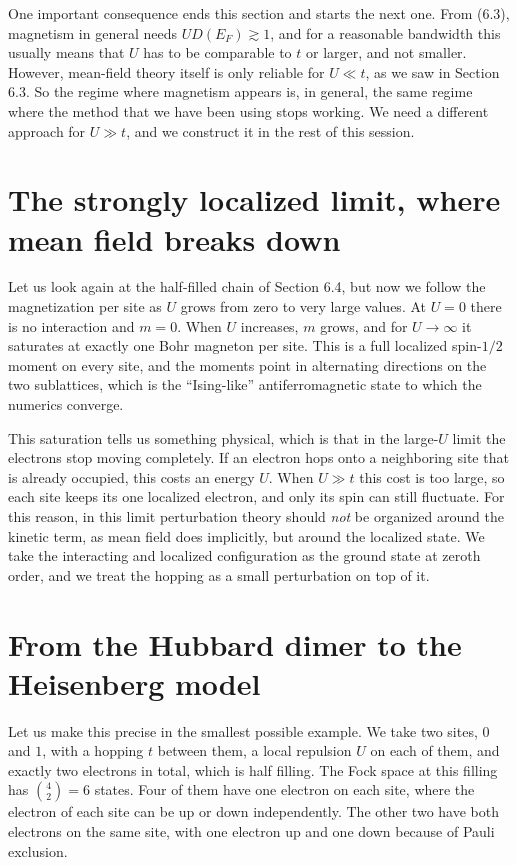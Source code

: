 One important consequence ends this section and starts the next one. From (6.3), magnetism in general
needs $U D(E_F) \gtrsim 1$, and for a reasonable bandwidth this usually means that $U$ has to be
comparable to $t$ or larger, and not smaller. However, mean-field theory itself is only reliable for
$U \ll t$, as we saw in Section 6.3. So the regime where magnetism appears is, in general, the same
regime where the method that we have been using stops working. We need a different approach for
$U \gg t$, and we construct it in the rest of this session.

\section{The strongly localized limit, where mean field breaks down}

Let us look again at the half-filled chain of Section 6.4, but now we follow the magnetization per site
as $U$ grows from zero to very large values. At $U=0$ there is no interaction and $m=0$. When $U$
increases, $m$ grows, and for $U\to\infty$ it saturates at exactly one Bohr magneton per site. This is
a full localized spin-$1/2$ moment on every site, and the moments point in alternating directions on
the two sublattices, which is the ``Ising-like'' antiferromagnetic state to which the numerics
converge.

This saturation tells us something physical, which is that in the large-$U$ limit the electrons stop
moving completely. If an electron hops onto a neighboring site that is already occupied, this costs an
energy $U$. When $U\gg t$ this cost is too large, so each site keeps its one localized electron, and
only its spin can still fluctuate. For this reason, in this limit perturbation theory should \emph{not}
be organized around the kinetic term, as mean field does implicitly, but around the localized state.
We take the interacting and localized configuration as the ground state at zeroth order, and we treat
the hopping as a small perturbation on top of it.

\section{From the Hubbard dimer to the Heisenberg model}

Let us make this precise in the smallest possible example. We take two sites, $0$ and $1$, with a
hopping $t$ between them, a local repulsion $U$ on each of them, and exactly two electrons in total,
which is half filling. The Fock space at this filling has $\binom{4}{2}=6$ states. Four of them have
one electron on each site, where the electron of each site can be up or down independently. The other
two have both electrons on the same site, with one electron up and one down because of Pauli
exclusion.

